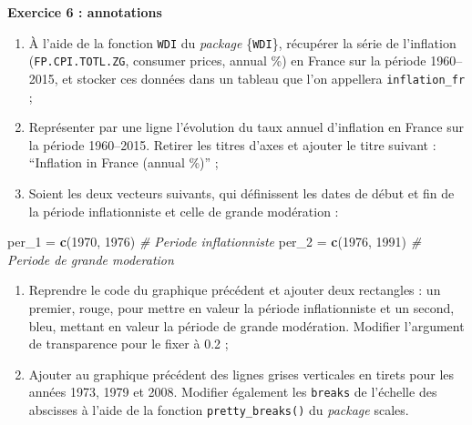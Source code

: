 \documentclass[
  11pt,
]{book}
\makeatletter
\newenvironment{Shaded}{\begin{snugshade}}{\end{snugshade}}
\newcommand{\CommentTok}[1]{\textcolor[rgb]{0.56,0.35,0.01}{\textit{#1}}}
\newcommand{\DecValTok}[1]{\textcolor[rgb]{0.00,0.00,0.81}{#1}}
\newcommand{\KeywordTok}[1]{\textcolor[rgb]{0.13,0.29,0.53}{\textbf{#1}}}
\newcommand{\NormalTok}[1]{#1}
\newcommand{\StringTok}[1]{\textcolor[rgb]{0.31,0.60,0.02}{#1}}
\numberwithin{equation}{section}
\numberwithin{countremarque}{section}
\newenvironment{exframe}{%
 \def\at@end@of@exframe{}%
 \ifinner\ifhmode%
  \def\at@end@of@exframe{\end{minipage}}%
  \begin{minipage}{\columnwidth}%
 \fi\fi%
 \def\FrameCommand##1{\hskip\@totalleftmargin \hskip-\fboxsep
 \colorbox{shadecolorex}{##1}\hskip-\fboxsep
     \hskip-\linewidth \hskip-\@totalleftmargin \hskip\columnwidth}%
 \MakeFramed {\advance\hsize-\width
   \@totalleftmargin\z@ \linewidth\hsize
   \@setminipage}}%
 {\par\unskip\endMakeFramed%
 \at@end@of@exframe}
\makeatother
\begin{document}
\begin{exframe}
\textbf{Exercice 6 : annotations}

\begin{enumerate}
\def\labelenumi{\arabic{enumi}.}
\item
  À l'aide de la fonction \texttt{WDI} du \emph{package} \{\texttt{WDI}\}, récupérer la série de l'inflation (\texttt{FP.CPI.TOTL.ZG}, consumer prices, annual \%) en France sur la période 1960--2015, et stocker ces données dans un tableau que l'on appellera \texttt{inflation\_fr} ;
\item
  Représenter par une ligne l'évolution du taux annuel d'inflation en France sur la période 1960--2015. Retirer les titres d'axes et ajouter le titre suivant : ``Inflation in France (annual \%)'' ;
\item
  Soient les deux vecteurs suivants, qui définissent les dates de début et fin de la période inflationniste et celle de grande modération :
\end{enumerate}
\end{exframe}

\begin{Shaded}
\begin{Highlighting}[]
\NormalTok{per\_}\DecValTok{1}\NormalTok{ =}\StringTok{ }\KeywordTok{c}\NormalTok{(}\DecValTok{1970}\NormalTok{, }\DecValTok{1976}\NormalTok{) }\CommentTok{\# Periode inflationniste}
\NormalTok{per\_}\DecValTok{2}\NormalTok{ =}\StringTok{ }\KeywordTok{c}\NormalTok{(}\DecValTok{1976}\NormalTok{, }\DecValTok{1991}\NormalTok{) }\CommentTok{\# Periode de grande moderation}
\end{Highlighting}
\end{Shaded}

\begin{exframe}
\begin{enumerate}
\def\labelenumi{\arabic{enumi}.}
\setcounter{enumi}{2}
\item
  Reprendre le code du graphique précédent et ajouter deux rectangles : un premier, rouge, pour mettre en valeur la période inflationniste et un second, bleu, mettant en valeur la période de grande modération. Modifier l'argument de transparence pour le fixer à 0.2 ;
\item
  Ajouter au graphique précédent des lignes grises verticales en tirets pour les années 1973, 1979 et 2008. Modifier également les \texttt{breaks} de l'échelle des abscisses à l'aide de la fonction \texttt{pretty\_breaks()} du \emph{package} scales.
\end{enumerate}
\end{exframe}
\end{document}
